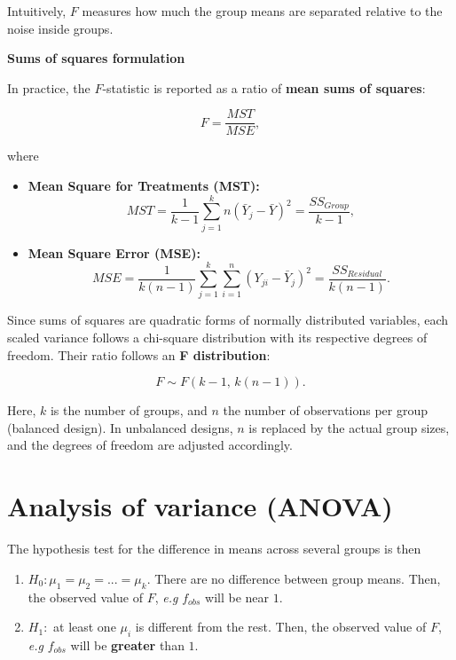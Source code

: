 \documentclass[
]{book}
\begin{document}
Intuitively, \(F\) measures how much the group means are separated relative to the noise inside groups.

\textbf{Sums of squares formulation}

In practice, the \(F\)-statistic is reported as a ratio of \textbf{mean sums of squares}:

\[
F = \frac{MST}{MSE},
\]

where

\begin{itemize}
\item
  \textbf{Mean Square for Treatments (MST):}\\
  \[
  MST = \frac{1}{k-1}\sum_{j=1}^k n(\bar{Y}_j-\bar{Y})^2
  = \frac{SS_{Group}}{k-1},
  \]
\item
  \textbf{Mean Square Error (MSE):}\\
  \[
  MSE = \frac{1}{k(n-1)}\sum_{j=1}^k\sum_{i=1}^n (Y_{ji}-\bar{Y}_j)^2
  = \frac{SS_{Residual}}{k(n-1)}.
  \]
\end{itemize}

Since sums of squares are quadratic forms of normally distributed variables, each scaled variance follows a chi-square distribution with its respective degrees of freedom. Their ratio follows an \textbf{F distribution}:

\[
F \sim F(k-1,\,k(n-1)).
\]

Here, \(k\) is the number of groups, and \(n\) the number of observations per group (balanced design). In unbalanced designs, \(n\) is replaced by the actual group sizes, and the degrees of freedom are adjusted accordingly.

\hypertarget{analysis-of-variance-anova}{%
\section{Analysis of variance (ANOVA)}\label{analysis-of-variance-anova}}

The hypothesis test for the difference in means across several groups is then

\begin{enumerate}
\def\labelenumi{\alph{enumi}.}
\item
  \(H_0: \mu_1=\mu_2= ...=\mu_k\). There are no difference between group means. Then, the observed value of \(F\), \emph{e.g} \(f_{obs}\) will be near \(1\).
\item
  \(H_1:\) at least one \(\mu_i\) is different from the rest. Then, the observed value of \(F\), \emph{e.g} \(f_{obs}\) will be \textbf{greater} than \(1\).
\end{enumerate}
\end{document}
